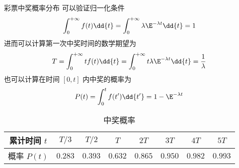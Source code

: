 \begin{example}{彩票中奖概率分布}
可以验证归一化条件
\begin{equation}
\int_0^{+\infty} f(t) \dd{t} = \int_0^{+\infty} \lambda\E^{-\lambda t} \dd{t} = 1
\end{equation}
进而可以计算第一次中奖时间的数学期望为
\begin{equation}
T = \int_0^{+\infty} t f(t) \dd{t} = \int_0^{+\infty}t \lambda\E^{-\lambda t} \dd{t} = \frac{1}{\lambda}
\end{equation}
也可以计算在时间 $[0, t]$ 内中奖的概率为
\begin{equation}
P(t) = \int_0^{t} f(t') \dd{t'} = 1 - \E^{-\lambda t}
\end{equation}
\begin{table}[ht]
\centering
\caption{中奖概率}\label{RandF_tab2}
\begin{tabular}{|c|c|c|c|c|c|c|c|}
\hline
累计时间 $t$ & $T/3$  & $T/2$  & $T$     & $2T$ &     $3T$   &  $4T$   & $5T$\\
\hline
概率 $P(t)$ & $0.283$ & $0.393$ & $0.632$ & $0.865$ & $0.950$ & $0.982$ & $0.993$\\
\hline
\end{tabular}
\end{table}
\end{example}
